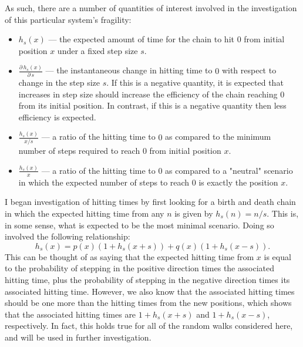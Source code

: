 As such, there are a number of quantities of interest involved in the investigation of this particular
system's fragility:
\begin{itemize}
    \item   $h_s(x)$ --- the expected amount of time for the chain to hit $0$ from initial position $x$
        under a fixed step size $s$.
    \item   $\frac{\partial\, h_s(x)}{\partial\, s}$ --- the instantaneous change in hitting time to $0$
        with respect to change in the step size $s$. If this is a negative quantity, it is expected
        that increases in step size should increase the efficiency of the chain reaching $0$ from its
        initial position. In contrast, if this is a negative quantity then less efficiency is expected.
    \item   $\frac{h_s(x)}{x/s}$ --- a ratio of the hitting time to $0$ as compared to the minimum number
        of steps required to reach $0$ from initial position $x$.
    \item   $\frac{h_s(x)}{x}$ --- a ratio of the hitting time to $0$ as compared to a "neutral" scenario
        in which the expected number of steps to reach $0$ is exactly the position $x$.
\end{itemize}

I began investigation of hitting times by first looking for a birth and death chain in which the
expected hitting time from any $n$ is given by $h_s(n) = n/s$. This is, in some sense, what is expected
to be the most minimal scenario. Doing so involved the following relationship:
\[
    h_s(x) = p(x)(1+h_s(x+s)) + q(x)(1+h_s(x-s)).
\]
This can be thought of as saying that the expected hitting time from $x$ is equal to the probability of
stepping in the positive direction times the associated hitting time, plus the probability of stepping
in the negative direction times its associated hitting time. However, we also know that the associated
hitting times should be one more than the hitting times from the new positions, which shows that the
associated hitting times are $1+h_s(x+s)$ and $1+h_s(x-s)$, respectively. In fact, this holds true for
all of the random walks considered here, and will be used in further investigation.

